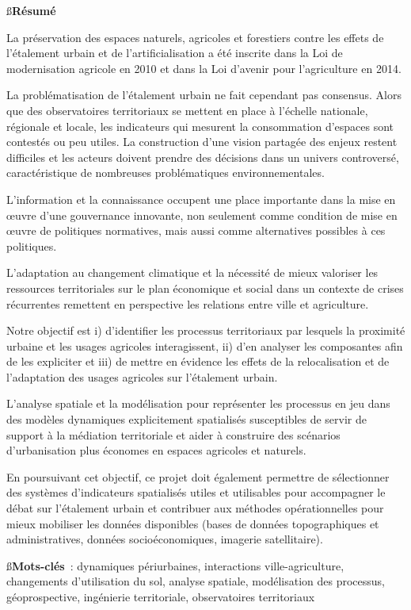 {\ss\bf Résumé}

La préservation des espaces naturels, agricoles et forestiers
contre les effets de l'étalement urbain et de l'artificialisation
a été inscrite dans la Loi de modernisation agricole en 2010
et dans la Loi d'avenir pour l'agriculture en 2014.

La problématisation de l'étalement urbain ne fait cependant pas consensus.
Alors que des observatoires territoriaux
se mettent en place à l'échelle nationale, régionale et locale,
les indicateurs qui mesurent la consommation d'espaces sont contestés ou peu utiles.
La construction d'une vision partagée des enjeux restent difficiles
et les acteurs doivent prendre des décisions dans un univers controversé,
caractéristique de nombreuses problématiques environnementales.

L'information et la connaissance occupent une place importante
dans la mise en œuvre d'une gouvernance innovante, non seulement comme condition
de mise en œuvre de politiques normatives, mais aussi comme
alternatives possibles à ces politiques.

L'adaptation au changement climatique et la nécessité
de mieux valoriser les ressources territoriales sur le plan économique
et social dans un contexte de crises récurrentes
remettent en perspective les relations entre ville et agriculture.

Notre objectif est
i) d'identifier les processus territoriaux par lesquels
la proximité urbaine et les usages agricoles interagissent,
ii) d'en analyser les composantes afin de les expliciter
et iii) de mettre en évidence les effets de la relocalisation et de l'adaptation
des usages agricoles sur l'étalement urbain.

L'analyse spatiale et la modélisation pour représenter les processus en jeu
dans des modèles dynamiques explicitement spatialisés
susceptibles de servir de support à la médiation territoriale 
et aider à construire des scénarios d'urbanisation
plus économes en espaces agricoles et naturels.

En poursuivant cet objectif,
ce projet doit également permettre de sélectionner des systèmes d'indicateurs
spatialisés utiles et utilisables pour accompagner le débat
sur l'étalement urbain et contribuer aux méthodes opérationnelles
pour mieux mobiliser les données disponibles
(bases de données topographiques et administratives, données socioéconomiques,
imagerie satellitaire).

\blank[2*big]

{\ss\bf Mots-clés} :
dynamiques périurbaines, interactions ville-agriculture,
changements d'utilisation du sol, analyse spatiale,
modélisation des processus,
géoprospective, ingénierie territoriale, observatoires territoriaux